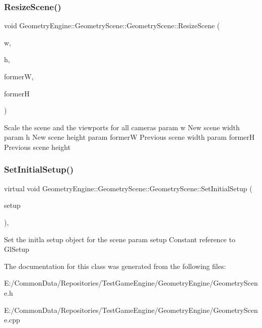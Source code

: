 \subsubsection{\texorpdfstring{ResizeScene()}{ResizeScene()}}
{\footnotesize\ttfamily void Geometry\+Engine\+::\+Geometry\+Scene\+::\+Geometry\+Scene\+::\+Resize\+Scene (\begin{DoxyParamCaption}\item[{int}]{w,  }\item[{int}]{h,  }\item[{int}]{formerW,  }\item[{int}]{formerH }\end{DoxyParamCaption})\hspace{0.3cm}{\ttfamily [virtual]}}

Scale the scene and the viewports for all cameras param w New scene width param h New scene height param formerW Previous scene width param formerH Previous scene height \mbox{\label{class_geometry_engine_1_1_geometry_scene_1_1_geometry_scene_a3c873554ae0898335d397d90aa2d25c3}} 
\subsubsection{\texorpdfstring{SetInitialSetup()}{SetInitialSetup()}}
{\footnotesize\ttfamily virtual void Geometry\+Engine\+::\+Geometry\+Scene\+::\+Geometry\+Scene\+::\+Set\+Initial\+Setup (\begin{DoxyParamCaption}\item[{const \mbox{\hyperlink{class_geometry_engine_1_1_geometry_gl_setup_1_1_gl_setup}{Geometry\+Gl\+Setup\+::\+Gl\+Setup}} \&}]{setup }\end{DoxyParamCaption})\hspace{0.3cm}{\ttfamily [inline]}, {\ttfamily [virtual]}}

Set the initla setup object for the scene param setup Constant reference to Gl\+Setup 

The documentation for this class was generated from the following files\+:\begin{DoxyCompactItemize}
\item 
E\+:/\+Common\+Data/\+Repositories/\+Test\+Game\+Engine/\+Geometry\+Engine/Geometry\+Scene.\+h\item 
E\+:/\+Common\+Data/\+Repositories/\+Test\+Game\+Engine/\+Geometry\+Engine/Geometry\+Scene.\+cpp\end{DoxyCompactItemize}

